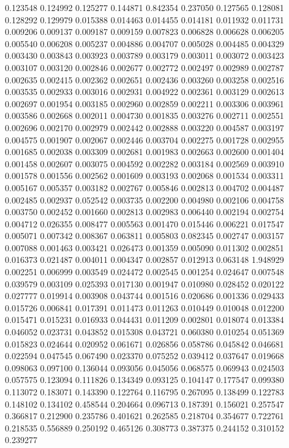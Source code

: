 0.123548
0.124992
0.125277
0.144871
0.842354
0.237050
0.127565
0.128081
0.128292
0.129979
0.015388
0.014463
0.014455
0.014181
0.011932
0.011731
0.009206
0.009137
0.009187
0.009159
0.007823
0.006828
0.006628
0.006205
0.005540
0.006208
0.005237
0.004886
0.004707
0.005028
0.004485
0.004329
0.003430
0.003843
0.003923
0.003789
0.003179
0.003011
0.003072
0.003423
0.003107
0.003120
0.002846
0.002677
0.002772
0.002497
0.002989
0.002787
0.002635
0.002415
0.002362
0.002651
0.002436
0.003260
0.003258
0.002516
0.003535
0.002933
0.003016
0.002931
0.004922
0.002361
0.003129
0.002613
0.002697
0.001954
0.003185
0.002960
0.002859
0.002211
0.003306
0.003961
0.003586
0.002668
0.002011
0.004730
0.001835
0.003276
0.002711
0.002551
0.002696
0.002170
0.002979
0.002442
0.002888
0.003220
0.004587
0.003197
0.004575
0.001907
0.002067
0.002446
0.003704
0.002275
0.001728
0.002955
0.001685
0.002038
0.003309
0.002681
0.001983
0.002663
0.002600
0.001404
0.001458
0.002607
0.003075
0.004592
0.002282
0.003184
0.002569
0.003910
0.001578
0.001556
0.002562
0.001609
0.003193
0.002068
0.001534
0.003311
0.005167
0.005357
0.003182
0.002767
0.005846
0.002813
0.004702
0.004487
0.002485
0.002937
0.052542
0.003735
0.002200
0.004980
0.002106
0.004758
0.003750
0.002452
0.001660
0.002813
0.002983
0.006440
0.002194
0.002754
0.004712
0.026355
0.008477
0.005563
0.001470
0.015446
0.006221
0.017547
0.005071
0.007342
0.008367
0.063811
0.005803
0.082345
0.002747
0.003157
0.007088
0.001463
0.003421
0.026473
0.001359
0.005090
0.011302
0.002851
0.016373
0.021487
0.004011
0.004347
0.002857
0.012913
0.063148
1.948929
0.002251
0.006999
0.003549
0.024472
0.002545
0.001254
0.024647
0.007548
0.039579
0.003109
0.025393
0.017130
0.001947
0.010980
0.028452
0.020122
0.027777
0.019914
0.003908
0.043744
0.001516
0.020686
0.001336
0.029433
0.015726
0.006841
0.017391
0.011473
0.011263
0.010449
0.010048
0.012200
0.015471
0.015231
0.016933
0.044431
0.011209
0.002801
0.018074
0.013384
0.046052
0.023731
0.043852
0.015308
0.043721
0.060380
0.010254
0.051369
0.015823
0.024644
0.020952
0.061671
0.026856
0.058786
0.045842
0.046681
0.022594
0.047545
0.067490
0.023370
0.075252
0.039412
0.037647
0.019668
0.098063
0.097100
0.136044
0.093056
0.045056
0.068575
0.069943
0.024503
0.057575
0.123094
0.111826
0.134349
0.093125
0.104147
0.177547
0.099380
0.113072
0.183071
0.143390
0.122764
0.116795
0.267095
0.138499
0.122783
0.148102
0.134102
0.458544
0.204664
0.096713
0.187391
0.156021
0.257547
0.366817
0.212900
0.235786
0.401621
0.262585
0.218704
0.354677
0.722761
0.218535
0.556889
0.250192
0.465126
0.308773
0.387375
0.244152
0.310152
0.239277
